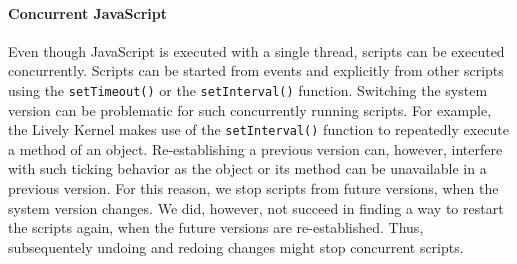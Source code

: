 \paragraph{Concurrent JavaScript}
Even though JavaScript is executed with a single thread, scripts can be executed concurrently.
Scripts can be started from events and explicitly from other scripts using the \lstinline{setTimeout()} or the \lstinline{setInterval()} function.
Switching the system version can be problematic for such concurrently running scripts.
For example, the Lively Kernel makes use of the \lstinline{setInterval()} function to repeatedly execute a method of an object.
Re-establishing a previous version can, however, interfere with such ticking behavior as the object or its method can be unavailable in a previous version.
For this reason, we stop scripts from future versions, when the system version changes.
We did, however, not succeed in finding a way to restart the scripts again, when the future versions are re-established.
Thus, subsequentely undoing and redoing changes might stop concurrent scripts.



